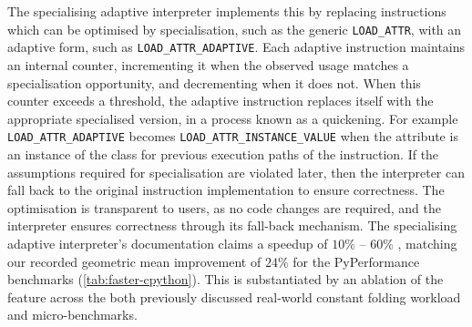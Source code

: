 The specialising adaptive interpreter implements this by replacing instructions which can be optimised by specialisation, such as the generic \texttt{LOAD\_ATTR}, with an adaptive form, such as \texttt{LOAD\_ATTR\_ADAPTIVE}. Each adaptive instruction maintains an internal counter, incrementing it when the observed usage matches a specialisation opportunity, and decrementing when it does not. When this counter exceeds a threshold, the adaptive instruction replaces itself with the appropriate specialised version, in a process known as a quickening. For example \texttt{LOAD\_ATTR\_ADAPTIVE} becomes \texttt{LOAD\_ATTR\_INSTANCE\_VALUE} when the attribute is an instance of the class for previous execution paths of the instruction.
If the assumptions required for specialisation are violated later, then the interpreter can fall back to the original instruction implementation to ensure correctness.
The optimisation is transparent to users, as no code changes are required, and the interpreter ensures correctness through its fall-back mechanism.
The specialising adaptive interpreter's documentation claims a speedup of $10\%$ -- $60\%$ \cite{pep659}, matching our recorded geometric mean improvement of $24\%$ for the PyPerformance benchmarks (\autoref{tab:faster-cpython}).
This is substantiated by an ablation of the feature across the both previously discussed real-world constant folding workload and micro-benchmarks.


